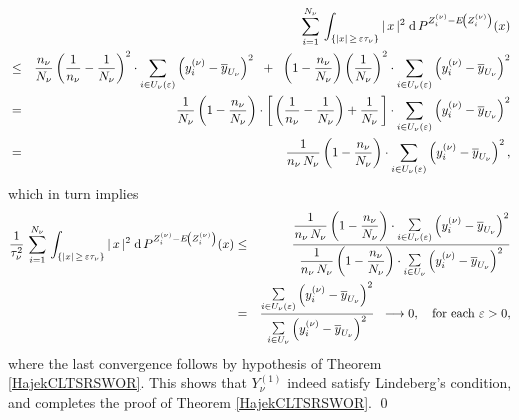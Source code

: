 \begin{eqnarray*}
&&
\sum_{i=1}^{N_{\nu}}\,
\int_{\left\{\vert x\vert \,\geq\, \varepsilon\tau_{\nu}\right\}}
\vert\,x\,\vert^{2}\;
\textnormal{d}\,P^{Z^{(\nu)}_{i} - E\!\left(Z^{(\nu)}_{i}\right)}(x)
\\
&\leq&
\dfrac{n_{\nu}}{N_{\nu}}\left(\dfrac{1}{n_{\nu}}-\dfrac{1}{N_{\nu}}\right)^{2}
\cdot\sum_{i\in U_{\nu}(\varepsilon)}\left(y^{(\nu)}_{i}-\overline{y}_{U_{\nu}}\right)^{2}
\;\; + \;\;
\left(1-\dfrac{n_{\nu}}{N_{\nu}}\right)
\left(\dfrac{1}{N_{\nu}}\right)^{2}
\cdot\sum_{i\in U_{\nu}(\varepsilon)}\left(y^{(\nu)}_{i}-\overline{y}_{U_{\nu}}\right)^{2}
\\
&=&
\dfrac{1}{N_{\nu}}
\left(1- \dfrac{n_{\nu}}{N_{\nu}}\right)
\cdot
\left[\,\left(\dfrac{1}{n_{\nu}} - \dfrac{1}{N_{\nu}}\right) + \dfrac{1}{N_{\nu}}\,\right]
\cdot\sum_{i\in U_{\nu}(\varepsilon)}\left(y^{(\nu)}_{i}-\overline{y}_{U_{\nu}}\right)^{2}
\\
&=&
\dfrac{1}{n_{\nu}\,N_{\nu}}
\left(1- \dfrac{n_{\nu}}{N_{\nu}}\right)
\cdot\sum_{i\in U_{\nu}(\varepsilon)}\left(y^{(\nu)}_{i}-\overline{y}_{U_{\nu}}\right)^{2},
\end{eqnarray*}
which in turn implies
\begin{eqnarray*}
\dfrac{1}{\tau^{2}_{\nu}}\,
\sum_{i=1}^{N_{\nu}}\,
\int_{\left\{\vert x\vert \,\geq\, \varepsilon\tau_{\nu}\right\}}
\vert\,x\,\vert^{2}\;
\textnormal{d}\,P^{Z^{(\nu)}_{i} - E\!\left(Z^{(\nu)}_{i}\right)}(x)
& \leq &
\dfrac{
\dfrac{1}{n_{\nu}\,N_{\nu}}
\left(1- \dfrac{n_{\nu}}{N_{\nu}}\right)
\cdot\underset{i\in U_{\nu}(\varepsilon)}{\textnormal{\Large$\sum$}}\left(y^{(\nu)}_{i}-\overline{y}_{U_{\nu}}\right)^{2}
}{
\dfrac{1}{n_{\nu}\,N_{\nu}}
\left(1- \dfrac{n_{\nu}}{N_{\nu}}\right)
\cdot\underset{i\in U_{\nu}}{\textnormal{\Large$\sum$}}\left(y^{(\nu)}_{i}-\overline{y}_{U_{\nu}}\right)^{2}
}
\\
& = &
\dfrac{
\underset{i\in U_{\nu}(\varepsilon)}{\textnormal{\Large$\sum$}}\left(y^{(\nu)}_{i}-\overline{y}_{U_{\nu}}\right)^{2}
}{
\underset{i\in U_{\nu}}{\textnormal{\Large$\sum$}}\left(y^{(\nu)}_{i}-\overline{y}_{U_{\nu}}\right)^{2}
}
\;\;\longrightarrow 0,
\quad
\textnormal{for each $\varepsilon > 0$},
\end{eqnarray*}
where the last convergence follows by hypothesis of Theorem \ref{HajekCLTSRSWOR}.
This shows that $Y^{(1)}_{\nu}$ indeed satisfy Lindeberg's condition, and completes the proof of
Theorem \ref{HajekCLTSRSWOR}.
\qed

